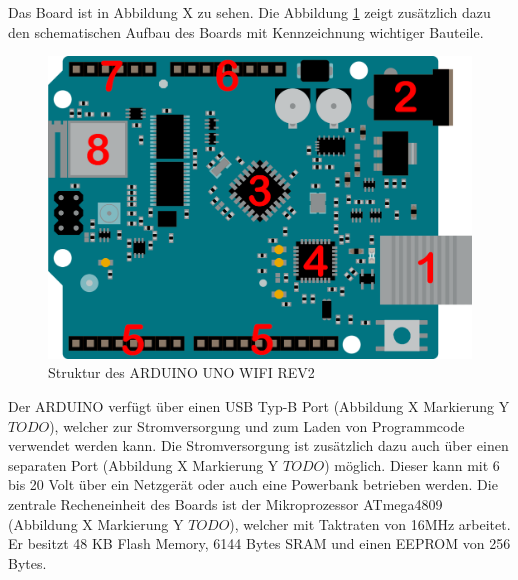 \documentclass[
    load-dhbw-templates,
    load-preamble = true,
    auto-intro-pages = all,
    add-tocs-to-toc,
    debug = true,
    language = english,
    mainlanguage = ngerman,
    add-bibliography,
    bib-file = dhbw-source.bib,
    biblatex/style = alphabetic, 
]{iodhbwm}
\begin{document}
        Das Board ist in Abbildung X zu sehen.%
        Die Abbildung \ref{fig:ARDUINOUNOSketch} zeigt zusätzlich dazu den schematischen Aufbau des Boards mit Kennzeichnung wichtiger Bauteile.
       

        \begin{figure}[H]
            \centering
            \includegraphics[scale=0.25]{../Quellenangaben/Dokumente/ARDUINO UNO REV2 Dokumentation/unorev2_edited.png}
            \caption[ARDUINOUNOSketch]{Struktur des ARDUINO UNO WIFI REV2 \footnotemark}
            \label{fig:ARDUINOUNOSketch} 
        \end{figure}
            
           
        Der ARDUINO verfügt über einen USB Typ-B Port (Abbildung X Markierung Y $TODO$), welcher zur Stromversorgung und zum Laden von Programmcode verwendet werden kann. Die Stromversorgung ist zusätzlich dazu auch über einen separaten Port (Abbildung X Markierung Y $TODO$) möglich. Dieser kann mit 6 bis 20 Volt über ein Netzgerät oder auch eine Powerbank betrieben werden.
        Die zentrale Recheneinheit des Boards ist der Mikroprozessor ATmega4809 (Abbildung X Markierung Y $TODO$), welcher mit Taktraten von 16MHz arbeitet. Er besitzt 48 KB Flash Memory, 6144 Bytes SRAM und einen EEPROM von 256 Bytes.%
\end{document}

